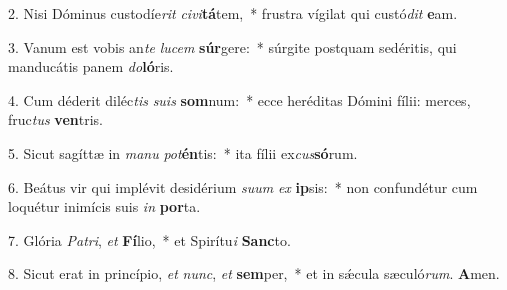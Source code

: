 2. Nisi Dóminus custodíe\textit{rit} \textit{ci}\textit{vi}\textbf{tá}tem,~*  frustra vígilat qui custó\textit{dit} \textbf{e}am.\

3. Vanum est vobis an\textit{te} \textit{lu}\textit{cem} \textbf{súr}gere:~*  súrgite postquam sedéritis, qui manducátis panem \textit{do}\textbf{ló}ris.\

4. Cum déderit diléc\textit{tis} \textit{su}\textit{is} \textbf{som}num:~*  ecce heréditas Dómini fílii: merces, fruc\textit{tus} \textbf{ven}tris.\

5. Sicut sagíttæ in \textit{ma}\textit{nu} \textit{pot}\textbf{én}tis:~*  ita fílii ex\textit{cus}\textbf{só}rum.\

6. Beátus vir qui implévit desidérium \textit{su}\textit{um} \textit{ex} \textbf{ip}sis:~*  non confundétur cum loquétur inimícis suis \textit{in} \textbf{por}ta.\

7. Glória \textit{Pa}\textit{tri}, \textit{et} \textbf{Fí}lio,~*  et Spirítu\textit{i} \textbf{Sanc}to.\

8. Sicut erat in princípio, \textit{et} \textit{nunc}, \textit{et} \textbf{sem}per,~*  et in sǽcula sæculó\textit{rum}. \textbf{A}men.\

